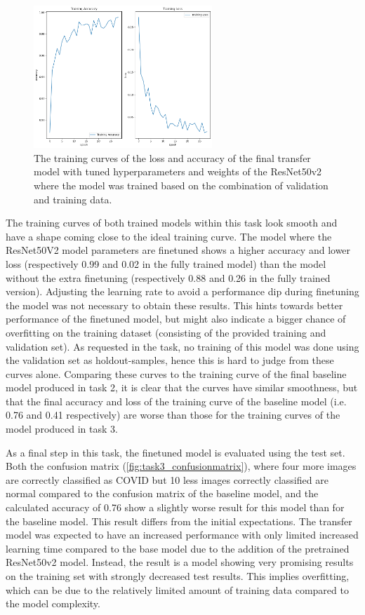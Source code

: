 \documentclass[conference]{IEEEtran}
\begin{document}
\begin{figure}[!htbp] \centering \includegraphics[width=0.6\textwidth]{fig_task3_training_curves_train_model_finetuned_resnet.png} 
	\caption{The training curves of the loss and accuracy of the final transfer model with tuned hyperparameters and weights of the ResNet50v2 where the model was trained based on the combination of validation and training data.} 
	\label{fig:task3_curves_final_resnet} 
\end{figure}


The training curves of both trained models within this task look smooth and have a shape coming close to the ideal training curve. 
The model where the ResNet50V2 model parameters are finetuned shows a higher accuracy and lower loss (respectively 0.99 and 0.02 in the fully trained model) than the model without the extra finetuning (respectively 0.88 and 0.26 in the fully trained version). Adjusting the learning rate to avoid a performance dip during finetuning the model was not necessary to obtain these results.
This hints towards better performance of the finetuned model, but might also indicate a bigger chance of overfitting on the training dataset (consisting of the provided training and validation set). As requested in the task, no training of this model was done using the validation set as holdout-samples, hence this is hard to judge from these curves alone.
Comparing these curves to the training curve of the final baseline model produced in task 2, it is clear that the curves have similar smoothness, but that the final accuracy and loss of the training curve of the baseline model (i.e. 0.76 and 0.41 respectively) are worse than those for the training curves of the model produced in task 3.

As a final step in this task, the finetuned model is evaluated using the test set. Both the confusion matrix (\ref{fig:task3_confusionmatrix}), where four more images are correctly classified as COVID but 10 less images correctly classified are normal compared to the confusion matrix of the baseline model, and the calculated accuracy of 0.76 show a slightly worse result for this model than for the baseline model. 
This result differs from the initial expectations. The transfer model was expected to have an increased performance with only limited increased learning time compared to the base model due to the addition of the pretrained ResNet50v2 model. Instead, the result is a model showing very promising results on the training set with strongly decreased test results. This implies overfitting, which can be due to the relatively limited amount of training data compared to the model complexity. 
\end{document}
